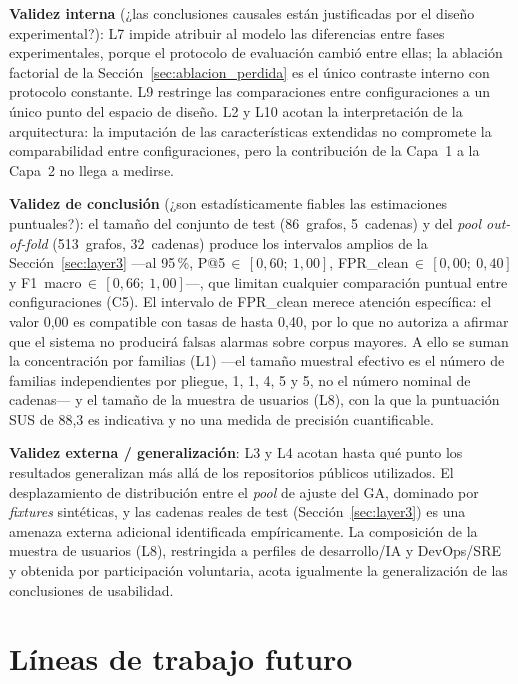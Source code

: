 \textbf{Validez interna} (¿las conclusiones causales están justificadas por el
diseño experimental?): L7 impide atribuir al modelo las diferencias entre fases
experimentales, porque el protocolo de evaluación cambió entre ellas; la ablación
factorial de la Sección~\ref{sec:ablacion_perdida} es el único contraste interno
con protocolo constante. L9 restringe las comparaciones entre configuraciones a un
único punto del espacio de diseño. L2 y L10 acotan la interpretación de la
arquitectura: la imputación de las características extendidas no compromete la
comparabilidad entre configuraciones, pero la contribución de la Capa~1 a la
Capa~2 no llega a medirse.

\textbf{Validez de conclusión} (¿son estadísticamente fiables las estimaciones
puntuales?): el tamaño del conjunto de test (86~grafos, 5~cadenas) y del
\textit{pool out-of-fold} (513~grafos, 32~cadenas) produce los intervalos amplios
de la Sección~\ref{sec:layer3} —al 95\,\%, P@5\,\(\in\,[0{,}60;\ 1{,}00]\),
\ac{FPR}\_clean\,\(\in\,[0{,}00;\ 0{,}40]\) y
F1~macro\,\(\in\,[0{,}66;\ 1{,}00]\)\mbox{—,} que limitan cualquier comparación puntual
entre configuraciones (C5). El intervalo de \ac{FPR}\_clean merece atención
específica: el valor 0,00 es compatible con tasas de hasta 0,40, por lo que no
autoriza a afirmar que el sistema no producirá falsas alarmas sobre corpus
mayores. A ello se suman la concentración por familias (L1) —el tamaño muestral
efectivo es el número de familias independientes por pliegue, 1, 1, 4, 5 y 5, no
el número nominal de cadenas— y el tamaño de la muestra de usuarios (L8), con la
que la puntuación \acs{SUS} de 88,3 es indicativa y no una medida de precisión
cuantificable.

\textbf{Validez externa / generalización}: L3 y L4 acotan hasta qué punto los
resultados generalizan más allá de los repositorios públicos utilizados. El
desplazamiento de distribución entre el \textit{pool} de ajuste del \ac{GA},
dominado por \textit{fixtures} sintéticas, y las cadenas reales de test
(Sección~\ref{sec:layer3}) es una amenaza externa adicional identificada
empíricamente. La composición de la muestra de usuarios (L8), restringida a
perfiles de desarrollo/IA y DevOps/SRE y obtenida por participación voluntaria,
acota igualmente la generalización de las conclusiones de usabilidad.

\section{Líneas de trabajo futuro}
\label{sec:trabajo_futuro}

